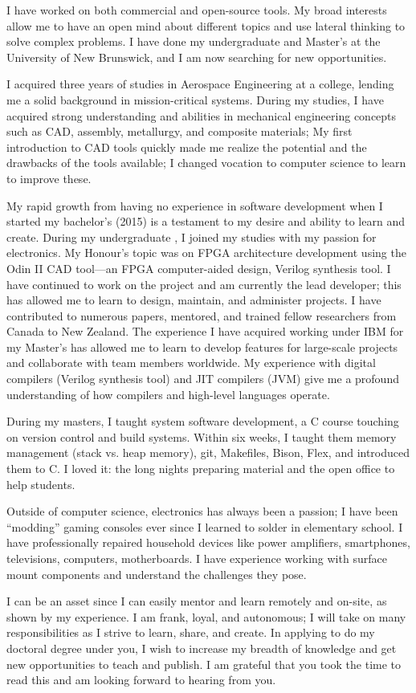 I have worked on both commercial and open-source tools.
My broad interests allow me to have an open mind about different topics and use lateral thinking to solve complex problems.
I have done my undergraduate and Master’s at the University of New Brunswick, and I am now searching for new opportunities.

I acquired three years of studies in Aerospace Engineering at a college, lending me a solid background in mission-critical systems.
During my studies, I have acquired strong understanding and abilities in mechanical engineering concepts such as CAD, assembly, metallurgy, and composite materials;
My first introduction to CAD tools quickly made me realize the potential and the drawbacks of the tools available; I changed vocation to computer science to learn to improve these.

My rapid growth from having no experience in software development when I started my bachelor’s (2015) is a testament to my desire and ability to learn and create.
During my undergraduate , I joined my studies with my passion for electronics. My Honour’s topic was on FPGA architecture development using the Odin II CAD tool—an FPGA computer-aided design, Verilog synthesis tool.
I have continued to work on the project and am currently the lead developer; this has allowed me to learn to design, maintain, and administer projects.
I have contributed to numerous papers, mentored, and trained fellow researchers from Canada to New Zealand.
The experience I have acquired working under IBM for my Master’s has allowed me to learn to develop features for large-scale projects and collaborate with team members worldwide.
My experience with digital compilers (Verilog synthesis tool) and JIT compilers (JVM) give me a profound understanding of how compilers and high-level languages operate.

During my masters, I taught system software development, a C course touching on version control and build systems.
Within six weeks, I taught them memory management (stack vs. heap memory), git, Makefiles, Bison, Flex, and introduced them to C.
I loved it: the long nights preparing material and the open office to help students.

Outside of computer science, electronics has always been a passion; I have been “modding” gaming consoles ever since I learned to solder in elementary school.
I have professionally repaired household devices like power amplifiers, smartphones, televisions, computers, motherboards.
I have experience working with surface mount components and understand the challenges they pose.

I can be an asset since I can easily mentor and learn remotely and on-site, as shown by my experience.
I am frank, loyal, and autonomous; I will take on many responsibilities as I strive to learn, share, and create.
In applying to do my doctoral degree under you, I wish to increase my breadth of knowledge and get new opportunities to teach and publish.
I am grateful that you took the time to read this and am looking forward to hearing from you.

